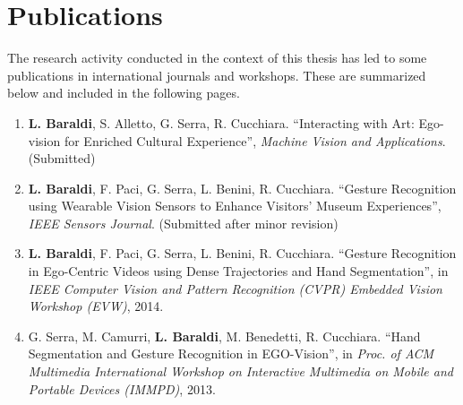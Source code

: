 
\chapter{Publications} %

\label{AppendixA} %


The research activity conducted in the context of this thesis has led to some publications in international journals
and workshops. These are summarized below and included in the following pages.

\begin{enumerate}
\item \textbf{L. Baraldi}, S. Alletto, G. Serra, R. Cucchiara. ``Interacting with Art: Ego-vision for Enriched Cultural Experience'', \textit{Machine Vision and Applications}. (Submitted)
\item \textbf{L. Baraldi}, F. Paci, G. Serra, L. Benini, R. Cucchiara. ``Gesture Recognition using Wearable Vision Sensors to Enhance Visitors’ Museum Experiences'', \textit{IEEE Sensors Journal}. (Submitted after minor revision)
\item \textbf{L. Baraldi}, F. Paci, G. Serra, L. Benini, R. Cucchiara. ``Gesture Recognition in Ego-Centric Videos using Dense Trajectories and Hand Segmentation'', in \textit{IEEE Computer Vision and Pattern Recognition (CVPR) Embedded Vision Workshop (EVW)}, 2014.
\item G. Serra, M. Camurri, \textbf{L. Baraldi}, M. Benedetti, R. Cucchiara. ``Hand Segmentation and Gesture Recognition in EGO-Vision'', in \textit{Proc. of ACM Multimedia International Workshop on Interactive Multimedia on Mobile and Portable Devices (IMMPD)}, 2013.
\end{enumerate}

\clearpage
\pagestyle{empty}



